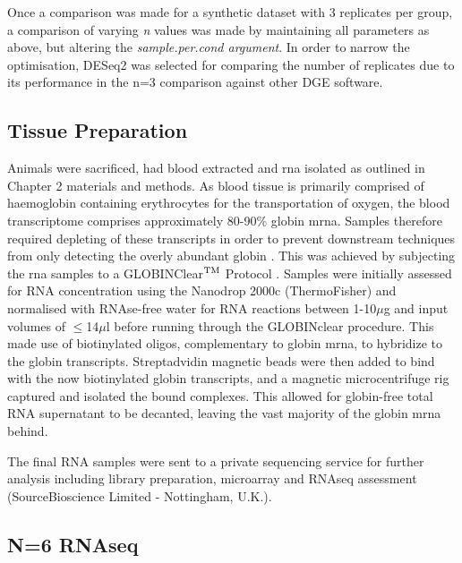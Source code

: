 Once a comparison was made for a synthetic dataset with 3 replicates per group, a comparison of varying \textit{n} values was made by maintaining all parameters as above, but altering the \textit{sample.per.cond argument}. In order to narrow the optimisation, DESeq2 was selected for comparing the number of replicates due to its performance in the n=3 comparison against other DGE software. 

\subsection{Tissue Preparation}

Animals were sacrificed, had blood extracted and \acrshort{rna} isolated as outlined in Chapter 2 materials and methods. As blood tissue is primarily comprised of haemoglobin containing erythrocytes for the transportation of oxygen, the blood transcriptome comprises approximately 80-90\% globin \acrshort{mrna}. Samples therefore required depleting of these transcripts in order to prevent downstream techniques from only detecting the overly abundant globin \cite{Shin2014}. This was achieved by subjecting the \acrshort{rna} samples to a GLOBINClear$\textsuperscript{TM}$ Protocol \cite{ThermoFisherScientific}. Samples were initially assessed for RNA concentration using the Nanodrop 2000c (ThermoFisher) and normalised with RNAse-free water for RNA reactions between 1-10$\mu$g and input volumes of $\leq$14$\mu$l before running through the GLOBINclear procedure. This made use of biotinylated oligos, complementary to globin \acrshort{mrna}, to hybridize to the globin transcripts. Streptadvidin magnetic beads were then added to bind with the now biotinylated globin transcripts, and a magnetic microcentrifuge rig captured and isolated the bound complexes. This allowed for globin-free total RNA supernatant to be decanted, leaving the vast majority of the globin \acrshort{mrna} behind.

The final RNA samples were sent to a private sequencing service for further analysis including library preparation, microarray and RNAseq assessment (SourceBioscience Limited - Nottingham, U.K.). 

\subsection{N=6 RNAseq}


